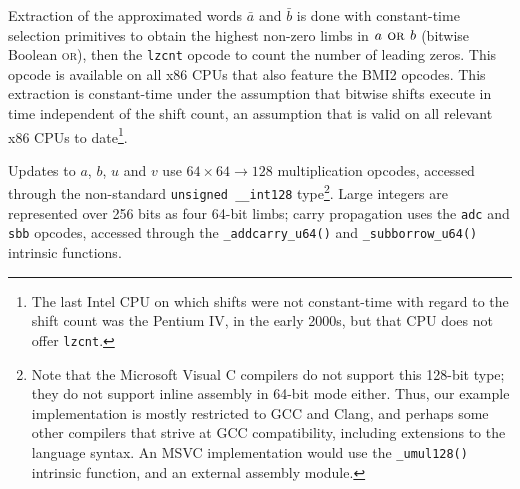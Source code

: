 \documentclass{llncs}
\begin{document}
Extraction of the approximated words $\bar a$ and $\bar b$ is done with
constant-time selection primitives to obtain the highest non-zero limbs
in $a \text{\textsc{\ or\ }} b$ (bitwise Boolean \textsc{or}), then
the \verb+lzcnt+ opcode to count the number of leading zeros. This
opcode is available on all x86 CPUs that also feature the BMI2 opcodes.
This extraction is constant-time under the assumption that bitwise shifts
execute in time independent of the shift count, an assumption that is
valid on all relevant x86 CPUs to date\footnote{The last Intel CPU on
which shifts were not constant-time with regard to the shift count was
the Pentium IV, in the early 2000s, but that CPU does not offer
\texttt{lzcnt}.}.

Updates to $a$, $b$, $u$ and $v$ use $64\times 64\rightarrow 128$
multiplication opcodes, accessed through the non-standard
\verb+unsigned __int128+ type\footnote{Note that the Microsoft Visual C
compilers do not support this 128-bit type; they do not support inline
assembly in 64-bit mode either. Thus, our example implementation is
mostly restricted to GCC and Clang, and perhaps some other compilers
that strive at GCC compatibility, including extensions to the language
syntax. An MSVC implementation would use the \texttt{\_umul128()} intrinsic
function, and an external assembly module.}. Large integers are
represented over 256 bits as four 64-bit limbs; carry propagation uses
the \verb+adc+ and \verb+sbb+ opcodes, accessed through the
\verb+_addcarry_u64()+ and \verb+_subborrow_u64()+ intrinsic functions.
\end{document}
